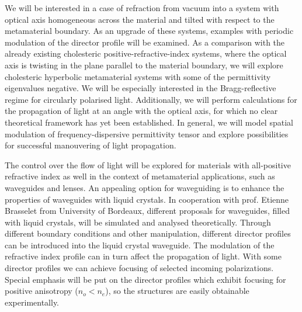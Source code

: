 \documentclass[a4paper,11pt]{article}
\begin{document}
We will be interested in a case of refraction from vacuum into a system with optical axis homogeneous across the material and tilted with respect to the metamaterial boundary. 
As an upgrade of these systems, examples with periodic modulation of the director profile will be examined. 
As a comparison with the already existing cholesteric positive-refractive-index systems, where the optical axis is twisting in the plane parallel to the material boundary, we will explore cholesteric hyperbolic metamaterial systems with some of the permittivity eigenvalues negative.
We will be especially interested in the Bragg-reflective regime for circularly polarised light. 
Additionally, we will perform calculations for the propagation of light at an angle with the optical axis, for which no clear theoretical framework has yet been established. 
In general, we will model spatial modulation of frequency-dispersive permittivity tensor and explore possibilities for successful manouvering of light propagation.  



The control over the flow of light will be explored for materials with all-positive refractive index as well in the context of metamaterial applications, such as waveguides and lenses. 
An appealing option for waveguiding is to enhance the properties of waveguides with liquid crystals. 
In cooperation with prof. Etienne Brasselet from University of Bordeaux, different proposals for waveguides, filled with liquid crystals, will be simulated and analysed theoretically. 
Through different boundary conditions and other manipulation, different director profiles can be introduced into the liquid crystal waveguide. 
The modulation of the refractive index profile can in turn affect the propagation of light. 
With some director profiles we can achieve focusing of selected incoming polarizations.
Special emphasis will be put on the director profiles which exhibit focusing for positive anisotropy ($n_{o} < n_e$), so the structures are easily obtainable experimentally. 
\end{document}
